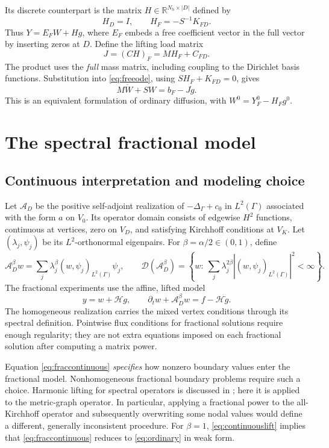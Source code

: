 \documentclass[11pt,a4paper]{article}
\newcommand{\R}{\mathbb R}
\newcommand{\G}{\Gamma}
\newcommand{\ip}[2]{\left(#1,#2\right)_{L^2(\G)}}
\begin{document}
Its discrete counterpart is the matrix $H\in\R^{N_h\times |D|}$ defined by
\begin{equation}\label{eq:H}
 H_D=I,\qquad H_F=-S^{-1}K_{FD}.
\end{equation}
Thus $Y=E_FW+Hg$, where $E_F$ embeds a free coefficient vector in the
full vector by inserting zeros at $D$. Define the lifting load matrix
\begin{equation}\label{eq:J}
 J=(CH)_F=MH_F+C_{FD}.
\end{equation}
The product uses the \emph{full} mass matrix, including coupling to the
Dirichlet basis functions. Substitution into \eqref{eq:freeode}, using
$SH_F+K_{FD}=0$, gives
\begin{equation}\label{eq:liftordinary}
 M\dot W+SW=b_F-J\dot g.
\end{equation}
This is an equivalent formulation of ordinary diffusion, with
$W^0=Y_F^0-H_Fg^0$.

\section{The spectral fractional model}
\subsection{Continuous interpretation and modeling choice}
Let $\mathcal A_D$ be the positive self-adjoint realization of
$-\Delta_\G+c_0$ in $L^2(\G)$ associated with the form $a$ on $V_0$.
Its operator domain consists of edgewise $H^2$ functions, continuous at
vertices, zero on $V_D$, and satisfying Kirchhoff conditions at $V_K$.
Let $(\lambda_j,\psi_j)$ be its $L^2$-orthonormal eigenpairs. For
$\beta=\alpha/2\in(0,1)$, define
\[
 \mathcal A_D^\beta w=\sum_j\lambda_j^\beta\ip{w}{\psi_j}\psi_j,
 \qquad
 \mathcal D(\mathcal A_D^\beta)=
 \left\{w:\ \sum_j\lambda_j^{2\beta}
                  |\ip{w}{\psi_j}|^2<\infty\right\}.
\]
The fractional experiments use the affine, lifted model
\begin{equation}\label{eq:fraccontinuous}
 \boxed{y=w+\mathcal H g,\qquad
 \partial_t w+\mathcal A_D^\beta w
          =f-\mathcal H\dot g.}
\end{equation}
The homogeneous realization carries the mixed vertex conditions through
its spectral definition. Pointwise flux conditions for fractional
solutions require enough regularity; they are not extra equations
imposed on each fractional solution after computing a matrix power.

Equation \eqref{eq:fraccontinuous} \emph{specifies} how nonzero boundary
values enter the fractional model. Nonhomogeneous fractional boundary
problems require such a choice. Harmonic lifting for spectral operators
is discussed in \cite{antil}; here it is applied to the metric-graph
operator. In particular, applying a fractional power to the
all-Kirchhoff operator and subsequently overwriting some nodal values
would define a different, generally inconsistent procedure.
For $\beta=1$, \eqref{eq:continuouslift} implies that
\eqref{eq:fraccontinuous} reduces to \eqref{eq:ordinary} in weak form.
\end{document}
